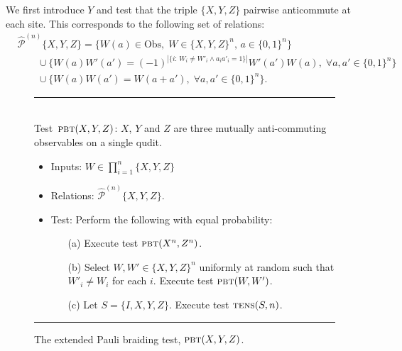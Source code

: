 \documentclass[11pt]{article}
\newtheorem{lemma}[theorem]{Lemma}
\theoremstyle{remark}
\theoremstyle{definition}
\newcommand{\setft}[1]{\mathrm{#1}}
\newcommand{\Obs}{\setft{Obs}}
\newcommand{\eps}{\varepsilon}
\newcommand{\pbt}{\textsc{pbt}}
\newcommand{\perm}{\textsc{tens}}
\newcommand{\epaulin}{\hat{\mathcal{P}}^{(n)}\!}
\begin{document}
We first introduce $Y$ and test that the triple $\{X,Y,Z\}$ pairwise anticommute at each site. This corresponds to the following set of relations: 
\begin{align*}
& {\epaulin}\{X,Y,Z\} = \Big\{ W(a)\in\Obs,\;W \in \{X,Y,Z\}^n,\,a\in\{0,1\}^n\Big\} \\
&\qquad\cup \Big\{W(a)W'(a')=(-1)^{|\{i:\,W_i\neq W'_i \wedge a_ia'_i=1\}|} W'(a')W(a),\;\forall a,a'\in\{0,1\}^n\Big\}\\
&\qquad \cup\Big\{ W(a)W(a')=W(a+a'),\;\forall a,a'\in\{0,1\}^n\Big\}.
\end{align*}




\begin{figure}[H]
\rule[1ex]{16.5cm}{0.5pt}\\
Test~$\pbt(X,Y,Z)$: $X$, $Y$ and $Z$ are three mutually anti-commuting observables on a single qudit. 
\begin{itemize}
\item Inputs: $W\in\prod_{i=1}^n\{X,Y,Z\}$
\item Relations: $\epaulin\{X,Y,Z\}$.  
\item Test: Perform the following with equal probability: 
\begin{enumerate}
\item[(a)] Execute test $\pbt(X^n,Z^n)$. 
\item[(b)] Select $W,W'\in  \{X,Y,Z\}^n$ uniformly at random such that $W'_i\neq W_i$ for each $i$. Execute test $\pbt(W,W')$. 
\item[(c)] Let $S = \{I,X,Y,Z\}$. Execute test $\perm(S,n)$. 
\end{enumerate}
\end{itemize}
\rule[2ex]{16.5cm}{0.5pt}\vspace{-1cm}
\caption{The extended Pauli braiding test, $\pbt(X,Y,Z)$.}
\label{fig:e-pbt}
\end{figure}


%
%
\end{document}
